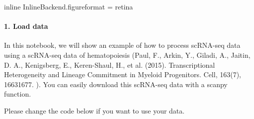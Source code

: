 \documentclass[letterpaper,10pt,english]{sphinxmanual}
\begin{document}
{
\begin{sphinxVerbatim}[commandchars=\\\{\}]
\llap{\color{nbsphinxin}[2]:\,\hspace{\fboxrule}\hspace{\fboxsep}} inline
 InlineBackend.figure\PYGZus{}format = \PYGZsq{}retina\PYGZsq{}
\PYG{p}{[}\PYG{p}{]}  
\PYG{p}{[}\PYG{p}{]}  \PYG{p}{[} \PYG{p}{]}
\end{sphinxVerbatim}
}


\paragraph{1. Load data}
\label{\detokenize{notebooks/03_scRNA-seq_data_preprocessing/scanpy_preprocessing_with_Paul_etal_2015_data:1.-Load-data}}
In this notebook, we will show an example of how to process scRNA-seq data using a scRNA-seq data of hematopoiesis (Paul, F., Arkin, Y., Giladi, A., Jaitin, D. A., Kenigsberg, E., Keren-Shaul, H., et al. (2015). Transcriptional Heterogeneity and Lineage Commitment in Myeloid Progenitors. Cell, 163(7), 1663\textendash{}1677. ). You can easily download this scRNA-seq data with a scanpy function.

Please change the code below if you want to use your data.

{
\begin{sphinxVerbatim}[commandchars=\\\{\}]
\llap{\color{nbsphinxin}[3]:\,\hspace{\fboxrule}\hspace{\fboxsep}}
  
\end{sphinxVerbatim}
}
\end{document}
